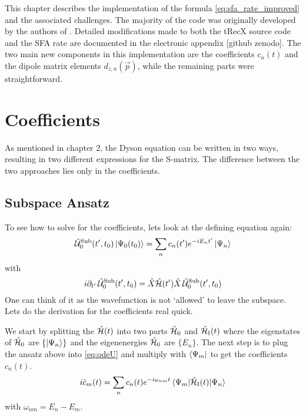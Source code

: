 This chapter describes the implementation of the formula \eqref{eq:sfa_rate_improved} and the associated challenges.
The majority of the code was originally developed by the authors of \cite{Theory_NPS}.
Detailed modifications made to both the tRecX source code and the SFA rate are documented in the electronic appendix [github zenodo].
The two main new components in this implementation are the coefficients $c_n(t)$ and the dipole matrix elements $d_{z,n}(\vec{p})$, while the remaining parts were straightforward.




\section{Coefficients}
As mentioned in chapter 2, the Dyson equation can be written in two ways, resulting in two different expressions for the S-matrix.
The difference between the two approaches lies only in the coefficients.



\subsection{Subspace Ansatz}
To see how to solve for the coefficients, lets look at the defining equation again:
\begin{equation*}
    \hat{\mathcal{U}}^{\mathrm{Sub}}_0(t',t_0)\ket{\Psi_0(t_0)} = \sum_{n}c_n(t')e^{-iE_nt'}\ket{\Psi_n}
\end{equation*}
with
\begin{equation}
    i\partial_{t'} \, \hat{\mathcal{U}}^{\mathrm{Sub}}_0(t',t_0) = \hat{X}\hat{\mathcal{H}}(t')\hat{X}\,\hat{\mathcal{U}}^{\mathrm{Sub}}_0(t',t_0)    \label{eq:odeU}
\end{equation}
One can think of it as the wavefunction is not `allowed' to leave the subspace. 
Lets do the derivation for the coefficients real quick.

We start by splitting the $\hat{\mathcal{H}}(t)$ into two parts $\hat{\mathcal{H}}_0$ and $\hat{\mathcal{H}}_{\mathrm{I}}(t)$ where the eigenstates of $\hat{\mathcal{H}}_0$ are $\{\ket{\Psi_n}\}$ and the eigenenergies $\hat{\mathcal{H}}_0$ are $\{E_n\}$. 
The next step is to plug the ansatz above into \eqref{eq:odeU} and multiply with $\bra{\Psi_m}$ to get the coefficients $c_n(t)$.
\begin{equation*}
    i  \dot{c}_m(t) = \sum_n c_n(t) e^{-i \omega_{nm} t} \braket{\Psi_m|\hat{\mathcal{H}}_{\mathrm{I}}(t)|\Psi_n}  \label{eq:ode}
\end{equation*}
with $\omega_{nm} = E_n - E_m$.


